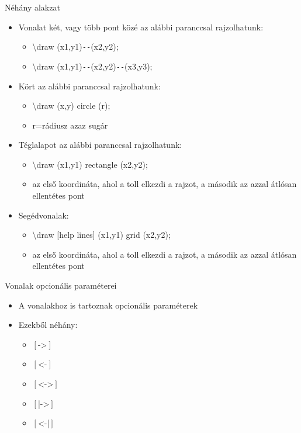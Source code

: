 \documentclass[11pt]{beamer}
\newcommand{\tbs}{\textbackslash}
\begin{document}
\begin{frame}[fragile]{Néhány alakzat}
\begin{itemize}
\item Vonalat két, vagy több pont közé az alábbi paranccsal rajzolhatunk:
	\begin{itemize}
	\item \tbs draw (x1,y1)\verb|--|(x2,y2);
	\item \tbs draw (x1,y1)\verb|--|(x2,y2)\verb|--|(x3,y3);
	\end{itemize}
\item Kört az alábbi paranccsal rajzolhatunk:
	\begin{itemize}
	\item \tbs draw (x,y) circle (r);
	\item r=rádiusz azaz sugár
	\end{itemize}
\item Téglalapot az alábbi paranccsal rajzolhatunk:
	\begin{itemize}
	\item \tbs draw (x1,y1) rectangle (x2,y2);
	\item az első koordináta, ahol a toll elkezdi a rajzot, a második az azzal átlósan ellentétes pont
	\end{itemize}
\item Segédvonalak:
	\begin{itemize}
	\item \tbs draw [help lines] (x1,y1) grid (x2,y2);
	\item az első koordináta, ahol a toll elkezdi a rajzot, a második az azzal átlósan ellentétes pont
	\end{itemize}
\end{itemize}
\end{frame}

\begin{frame}{Vonalak opcionális paraméterei}
\begin{itemize}
\item A vonalakhoz is tartoznak opcionális paraméterek
\item Ezekből néhány:
	\begin{itemize}
	\item $\left[\right.$->$\left.\right]$
	\item $\left[\right.$<-$\left.\right]$
	\item $\left[\right.$<->$\left.\right]$
	\item $\left[\right.$|->$\left.\right]$
	\item $\left[\right.$<-|$\left.\right]$
	\end{itemize}
\end{itemize}
\end{frame}
\end{document}
